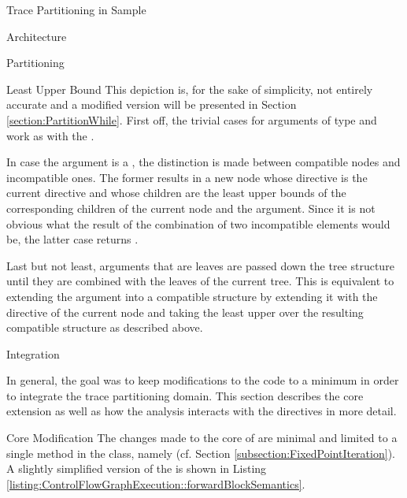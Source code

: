 \begin{chapter}{Trace Partitioning in Sample}
\begin{section}{Architecture}
\begin{subsection}{Partitioning}
\begin{subsubsection}{Least Upper Bound}
				This depiction is, for the sake of simplicity, not entirely accurate and a modified version will be presented in Section \ref{section:PartitionWhile}. First off, the trivial cases for arguments of type  and  work as with the . 
				
				In case the argument is a , the distinction is made between compatible nodes and incompatible ones. The former results in a new node whose directive is the current directive and whose children are the least upper bounds of the corresponding children of the current node and the argument. Since it is not obvious what the result of the combination of two incompatible elements would be, the latter case returns . 
				
				Last but not least, arguments that are leaves are passed down the tree structure until they are combined with the leaves of the current tree. This is equivalent to extending the argument into a compatible structure by extending it with the directive of the current node and taking the least upper over the resulting compatible structure as described above.
			\end{subsubsection}
		\end{subsection}
	\end{section}


	\begin{section}{Integration}
		\label{section:Integration}

		In general, the goal was to keep modifications to the \sample code to a minimum in order to integrate the trace partitioning domain. This section describes the core extension as well as how the analysis interacts with the directives in more detail.

		
		\begin{subsection}{Core Modification}
			The changes made to the core of \sample are minimal and limited to a single method in the  class, namely  (cf. Section \ref{subsection:FixedPointIteration}). A slightly simplified version of the  is shown in Listing \ref{listing:ControlFlowGraphExecution::forwardBlockSemantics}.

			


\end{subsection}
\end{section}
\end{chapter}
